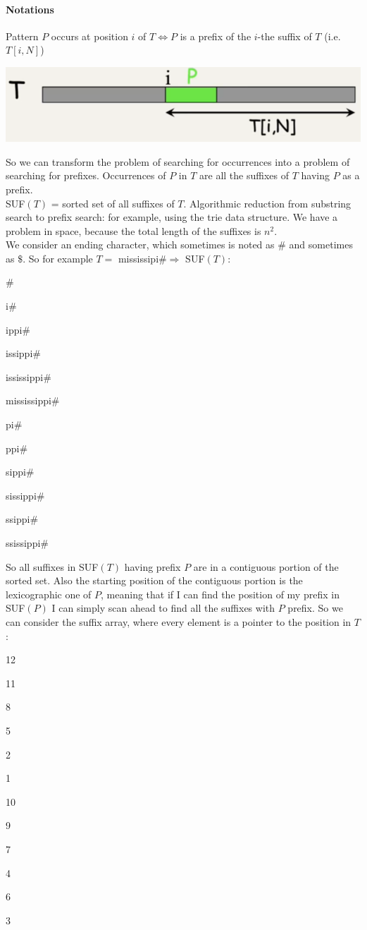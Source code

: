 \documentclass[10pt]{report}
\begin{document}
\paragraph{Notations} Pattern $P$ occurs at position $i$ of $T\Leftrightarrow P$ is a prefix of the $i$-the suffix of $T$ (i.e. $T[i,N]$)\begin{center}
	\includegraphics[scale=0.75]{19.png}
\end{center}
So we can transform the problem of searching for occurrences into a problem of searching for prefixes. Occurrences of $P$ in $T$ are all the suffixes of $T$ having $P$ as a prefix.\\
SUF$(T)$ = sorted set of all suffixes of $T$. Algorithmic reduction from substring search to prefix search: for example, using the trie data structure. We have a problem in space, because the total length of the suffixes is $n^2$.\\
We consider an ending character, which sometimes is noted as $\#$ and sometimes as $\$$. So for example $T =$ mississipi$\# \Rightarrow$ SUF$(T)$:
\begin{list}{}{}
	\item \#
	\item i\#
	\item ippi\#
	\item issippi\#
	\item ississippi\#
	\item mississippi\#
	\item pi\#
	\item ppi\#
	\item sippi\#
	\item sissippi\#
	\item ssippi\#
	\item ssissippi\#
\end{list}
So all suffixes in SUF$(T)$ having prefix $P$ are in a contiguous portion of the sorted set. Also the starting position of the contiguous portion is the lexicographic one of $P$, meaning that if I can find the position of my prefix in SUF$(P)$ I can simply scan ahead to find all the suffixes with $P$ prefix. So we can consider the suffix array, where every element is a pointer to the position in $T$:
\begin{list}{}{}
	\item 12
	\item 11
	\item 8
	\item 5
	\item 2
	\item 1
	\item 10
	\item 9
	\item 7
	\item 4
	\item 6
	\item 3
\end{list}
\end{document}
